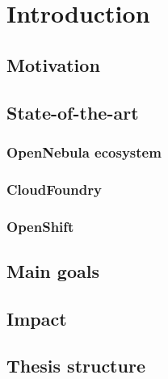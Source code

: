 \chapter{Introduction}

\section{Motivation}

\section{State-of-the-art}

\subsection*{OpenNebula ecosystem}

\subsection*{CloudFoundry}

\subsection*{OpenShift}

\section{Main goals}

\section{Impact}

\section{Thesis structure}


